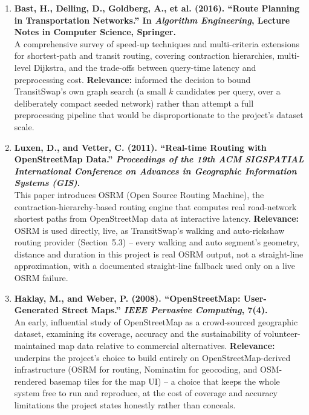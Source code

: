 \documentclass[12pt,a4paper]{report}
\begin{document}
\begin{enumerate}[leftmargin=*]
\item \textbf{Bast, H., Delling, D., Goldberg, A., et al. (2016). ``Route Planning in
Transportation Networks.'' In \textit{Algorithm Engineering}, Lecture Notes in Computer
Science, Springer.}\\
A comprehensive survey of speed-up techniques and multi-criteria extensions for shortest-path and
transit routing, covering contraction hierarchies, multi-level Dijkstra, and the trade-offs between
query-time latency and preprocessing cost. \textbf{Relevance:} informed the decision to bound
TransitSwap's own graph search (a small \(k\) candidates per query, over a deliberately compact
seeded network) rather than attempt a full preprocessing pipeline that would be disproportionate to
the project's dataset scale.

\item \textbf{Luxen, D., and Vetter, C. (2011). ``Real-time Routing with OpenStreetMap Data.''
\textit{Proceedings of the 19th ACM SIGSPATIAL International Conference on Advances in
Geographic Information Systems (GIS)}.}\\
This paper introduces OSRM (Open Source Routing Machine), the contraction-hierarchy-based routing
engine that computes real road-network shortest paths from OpenStreetMap data at interactive
latency. \textbf{Relevance:} OSRM is used directly, live, as TransitSwap's walking and
auto-rickshaw routing provider (Section~5.3) -- every walking and auto segment's geometry, distance
and duration in this project is real OSRM output, not a straight-line approximation, with a
documented straight-line fallback used only on a live OSRM failure.

\item \textbf{Haklay, M., and Weber, P. (2008). ``OpenStreetMap: User-Generated Street Maps.''
\textit{IEEE Pervasive Computing}, 7(4).}\\
An early, influential study of OpenStreetMap as a crowd-sourced geographic dataset, examining its
coverage, accuracy and the sustainability of volunteer-maintained map data relative to commercial
alternatives. \textbf{Relevance:} underpins the project's choice to build entirely on
OpenStreetMap-derived infrastructure (OSRM for routing, Nominatim for geocoding, and OSM-rendered
basemap tiles for the map UI) -- a choice that keeps the whole system free to run and reproduce,
at the cost of coverage and accuracy limitations the project states honestly rather than conceals.


\end{enumerate}
\end{document}
